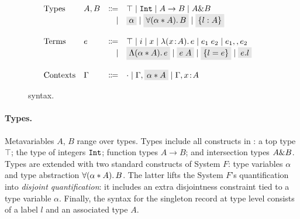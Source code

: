 \begin{figure}[!t]
  \[
    \begin{array}{l}
      \begin{array}{llrll}
        \text{Types}
        & A, B & \Coloneqq & \top \mid \tyint \mid A \to B \mid A \inter B & \\ 
        &      & \mid &
                 \highlight{$\alpha$} \mid \highlight{$\fordis \alpha A B$} 
                 \mid \highlight{$\recordType l A$} & \\

        \\
        \text{Terms}
        & e & \Coloneqq & \top \mid i \mid x \mid \lamty x A e \mid \app {e_1} {e_2} 
              \mid e_1 \mergeop e_2 & \\
        &   & \mid & \highlight{$\blamdis \alpha A e$} \mid \highlight{$\tapp e A$} \mid 
              \highlight{$\recordCon l e$} \mid \highlight{$\recordProj e l$}     & \\

        \\
        \text{Contexts}
        & \Gamma & \Coloneqq & \cdot
                   \mid \Gamma, \highlight{$\alpha \disjoint A$}
                   \mid \Gamma, x \oftype A  & \\
      \end{array}
    \end{array}
  \]

  \caption{\name syntax.}
  \label{fig:fi-syntax}
\end{figure}

\paragraph{Types.} 
Metavariables $A$, $B$ range over types. 
Types include all constructs in \oldname: a top type $\top$; 
the type of integers $\texttt{Int}$;
function types $A \to B$; and intersection types $A \& B$.
Types are extended with two standard constructs of System $F$: 
type variables $\alpha$ and type abstraction $\forall (\alpha * A).\, B$. 
The latter lifts the System $F$'s quantification into \emph{disjoint quantification}:
it includes an extra disjointness constraint tied to a type variable $\alpha$.
Finally, the syntax for the singleton record at type level consists of a label $l$ and
an associated type $A$.

